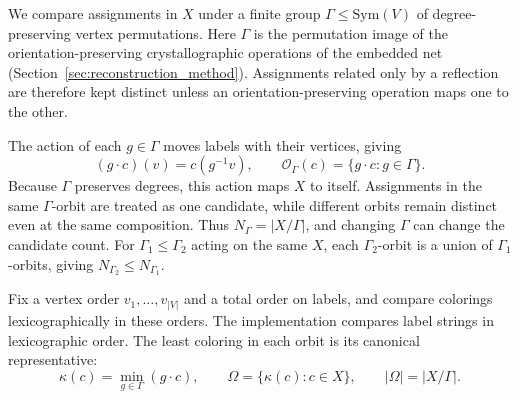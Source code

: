\documentclass[a5paper, 10pt]{article}
\begin{document}
We compare assignments in $X$ under a finite group $\Gamma\leq\mathrm{Sym}(V)$ of degree-preserving vertex permutations.
Here $\Gamma$ is the permutation image of the orientation-preserving crystallographic operations of the embedded net (Section~\ref{sec:reconstruction_method}). Assignments related only by a reflection are therefore kept distinct unless an orientation-preserving operation maps one to the other.

The action of each $g\in\Gamma$ moves labels with their vertices, giving
\begin{equation}
(g\cdot c)(v)=c(g^{-1}v),\qquad
\mathcal{O}_{\Gamma}(c)=\{g\cdot c:g\in\Gamma\}.
\label{eq:group_action}
\end{equation}
Because $\Gamma$ preserves degrees, this action maps $X$ to itself. Assignments in the same $\Gamma$-orbit are treated as one candidate, while different orbits remain distinct even at the same composition. Thus $N_\Gamma=|X/\Gamma|$, and changing $\Gamma$ can change the candidate count. For $\Gamma_1\leq\Gamma_2$ acting on the same $X$, each $\Gamma_2$-orbit is a union of $\Gamma_1$-orbits, giving $N_{\Gamma_2}\leq N_{\Gamma_1}$.


Fix a vertex order $v_1,\ldots,v_{|V|}$ and a total order on labels, and compare colorings lexicographically in these orders. The implementation compares label strings in lexicographic order. The least coloring in each orbit is its canonical representative:
\begin{equation}
\kappa(c)=\min_{g\in\Gamma}(g\cdot c),\qquad
\Omega=\{\kappa(c):c\in X\},\qquad |\Omega|=|X/\Gamma|.
\label{eq:canonical_rep}
\end{equation}
\end{document}
